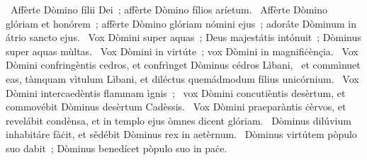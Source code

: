 ~Affèrte Dòmino fílii Dei~; affèrte Dòmino fílios aríetum. 
~Affèrte Dòmino glóriam et honórem~; affèrte Dòmino glóriam nómini ejus~; adoráte Dòminum in átrio sancto ejus. 
~Vox Dòmini super aquas~; Deus majestátis intónuit~; Dòminus super aquas mùltas. 
~Vox Dòmini in virtúte~; vox Dòmini in magnifiċènçia. 
~Vox Dòmini confringèntis cedros, et confrìnget Dòminus cédros Lìbani, 
~et commìnuet eas, tàmquam vìtulum Lìbani, et diléctus quemádmodum fílius unicórnium. 
~Vox Dòmini intercaedèntis flammam ìgnis~; 
~vox Dòmini concutièntis desèrtum, et commovébit Dòminus desèrtum Cadèssis. 
~Vox Dòmini praeparàntis ċèrvos, et revelábit condènsa, et in templo ejus òmnes dicent glóriam. 
~Dòminus dilúvium inhabitáre fàċit, et sědébit Dòminus rex in aetèrnum. 
~Dòminus virtútem pòpulo suo dabit~; Dòminus benedícet pòpulo suo in paċe. 
